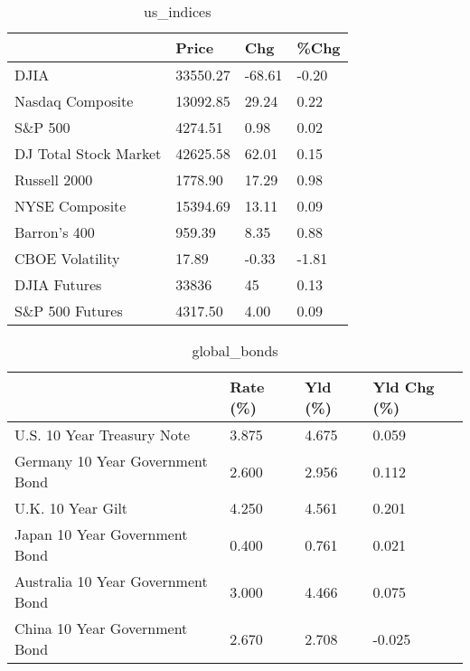 \documentclass{article}%
\begin{document}
%


\begin{table}[htbp]%
\caption{us\_indices}%
\centering%
\begin{adjustbox}{width=1\textwidth}%
\begin{tabular}{llll}
\toprule
                      &    Price &    Chg &  \%Chg \\
\midrule
                 DJIA & 33550.27 & -68.61 & -0.20 \\
     Nasdaq Composite & 13092.85 &  29.24 &  0.22 \\
              S\&P 500 &  4274.51 &   0.98 &  0.02 \\
DJ Total Stock Market & 42625.58 &  62.01 &  0.15 \\
         Russell 2000 &  1778.90 &  17.29 &  0.98 \\
       NYSE Composite & 15394.69 &  13.11 &  0.09 \\
         Barron's 400 &   959.39 &   8.35 &  0.88 \\
      CBOE Volatility &    17.89 &  -0.33 & -1.81 \\
         DJIA Futures &    33836 &     45 &  0.13 \\
      S\&P 500 Futures &  4317.50 &   4.00 &  0.09 \\
\bottomrule
\end{tabular}
%
\end{adjustbox}%
\end{table}

%


\begin{table}[htbp]%
\caption{global\_bonds}%
\centering%
\begin{adjustbox}{width=1\textwidth}%
\begin{tabular}{llll}
\toprule
                                  & Rate (\%) & Yld (\%) & Yld Chg (\%) \\
\midrule
       U.S. 10 Year Treasury Note &    3.875 &   4.675 &       0.059 \\
  Germany 10 Year Government Bond &    2.600 &   2.956 &       0.112 \\
                U.K. 10 Year Gilt &    4.250 &   4.561 &       0.201 \\
    Japan 10 Year Government Bond &    0.400 &   0.761 &       0.021 \\
Australia 10 Year Government Bond &    3.000 &   4.466 &       0.075 \\
    China 10 Year Government Bond &    2.670 &   2.708 &      -0.025 \\
\bottomrule
\end{tabular}
%
\end{adjustbox}%
\end{table}
\end{document}
